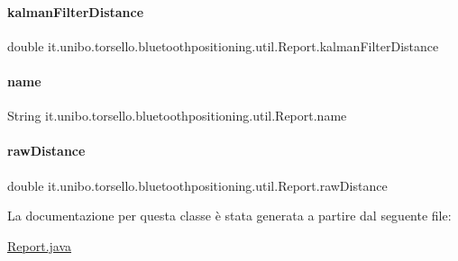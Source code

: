 \paragraph{\texorpdfstring{kalman\+Filter\+Distance}{kalmanFilterDistance}}
{\footnotesize\ttfamily double it.\+unibo.\+torsello.\+bluetoothpositioning.\+util.\+Report.\+kalman\+Filter\+Distance\hspace{0.3cm}{\ttfamily [private]}}

\hypertarget{classit_1_1unibo_1_1torsello_1_1bluetoothpositioning_1_1util_1_1Report_a0495bf689006bace414e202fd6fc14f2_a0495bf689006bace414e202fd6fc14f2}{}\label{classit_1_1unibo_1_1torsello_1_1bluetoothpositioning_1_1util_1_1Report_a0495bf689006bace414e202fd6fc14f2_a0495bf689006bace414e202fd6fc14f2} 
\paragraph{\texorpdfstring{name}{name}}
{\footnotesize\ttfamily String it.\+unibo.\+torsello.\+bluetoothpositioning.\+util.\+Report.\+name\hspace{0.3cm}{\ttfamily [private]}}

\hypertarget{classit_1_1unibo_1_1torsello_1_1bluetoothpositioning_1_1util_1_1Report_a93ee0f28ccf1d54becdedff2ad65955f_a93ee0f28ccf1d54becdedff2ad65955f}{}\label{classit_1_1unibo_1_1torsello_1_1bluetoothpositioning_1_1util_1_1Report_a93ee0f28ccf1d54becdedff2ad65955f_a93ee0f28ccf1d54becdedff2ad65955f} 
\paragraph{\texorpdfstring{raw\+Distance}{rawDistance}}
{\footnotesize\ttfamily double it.\+unibo.\+torsello.\+bluetoothpositioning.\+util.\+Report.\+raw\+Distance\hspace{0.3cm}{\ttfamily [private]}}



La documentazione per questa classe è stata generata a partire dal seguente file\+:\begin{DoxyCompactItemize}
\item 
\hyperlink{Report_8java}{Report.\+java}\end{DoxyCompactItemize}
